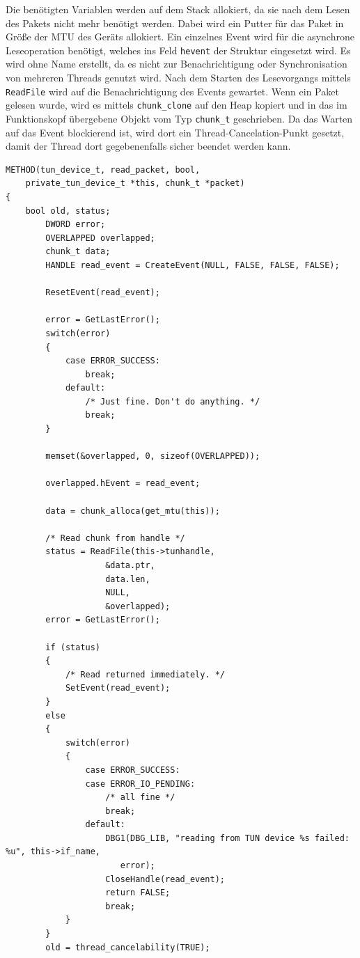 {Die benötigten Variablen werden auf dem Stack allokiert, da sie nach dem Lesen
des Pakets nicht mehr benötigt werden. Dabei wird ein Putter für das Paket in Größe
der \ac{MTU} des Geräts allokiert. Ein einzelnes Event wird für die asynchrone
Leseoperation benötigt, welches ins Feld \texttt{hevent} der Struktur eingesetzt wird.
Es wird ohne Name erstellt, da es nicht zur Benachrichtigung oder Synchronisation
von mehreren Threads genutzt wird. Nach dem Starten des Lesevorgangs mittels \texttt{ReadFile}
wird auf die Benachrichtigung des Events gewartet. Wenn ein Paket gelesen wurde,
wird es mittels \texttt{chunk\_clone} auf den Heap kopiert und in das im Funktionskopf
übergebene Objekt vom Typ \texttt{chunk\_t} geschrieben.
Da das Warten auf das Event
blockierend ist, wird dort ein Thread-Cancelation-Punkt gesetzt, damit der Thread dort
gegebenenfalls sicher beendet werden kann.

\begin{lstlisting}[caption=Code für read\_packet,label=lst:read_packet]
METHOD(tun_device_t, read_packet, bool,
	private_tun_device_t *this, chunk_t *packet)
{
	bool old, status;
        DWORD error;
        OVERLAPPED overlapped;
	    chunk_t data;
        HANDLE read_event = CreateEvent(NULL, FALSE, FALSE, FALSE);

        ResetEvent(read_event);

        error = GetLastError();
        switch(error)
        {
            case ERROR_SUCCESS:
                break;
            default:
                /* Just fine. Don't do anything. */
                break;
        }

        memset(&overlapped, 0, sizeof(OVERLAPPED));

        overlapped.hEvent = read_event;

	    data = chunk_alloca(get_mtu(this));

        /* Read chunk from handle */
        status = ReadFile(this->tunhandle,
                    &data.ptr,
                    data.len,
                    NULL,
                    &overlapped);
        error = GetLastError();

        if (status)
        {
            /* Read returned immediately. */
            SetEvent(read_event);
        }
        else
        {
            switch(error)
            {
                case ERROR_SUCCESS:
                case ERROR_IO_PENDING:
                    /* all fine */
                    break;
                default:
                    DBG1(DBG_LIB, "reading from TUN device %s failed: %u", this->if_name,
                       error);
                    CloseHandle(read_event);
                    return FALSE;
                    break;
            }
        }
        old = thread_cancelability(TRUE);


\end{lstlisting}}
